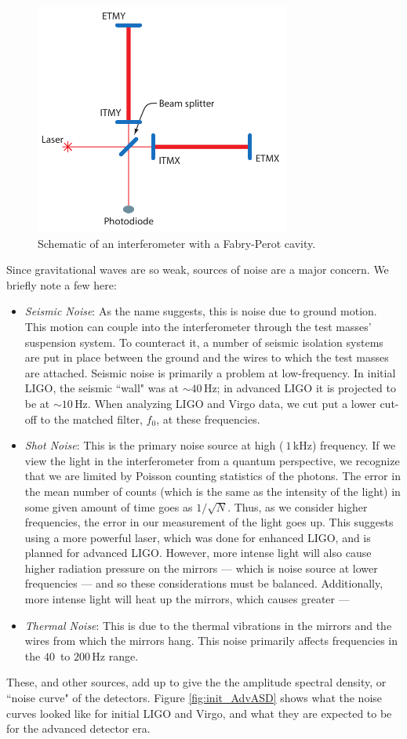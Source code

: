 \begin{figure}[htbp]
\center
\includegraphics[height=3in]{figures/fabry-perot.pdf}
\caption{Schematic of an interferometer with a Fabry-Perot cavity.}
\label{fig:fabry_perot}
\end{figure}

Since gravitational waves are so weak, sources of noise are a major concern. We briefly note a few here:
\begin{itemize}
\item{\emph{Seismic Noise}: As the name suggests, this is noise due to ground motion. This motion can couple into the interferometer through the test masses' suspension system. To counteract it, a number of seismic isolation systems are put in place between the ground and the wires to which the test masses are attached. Seismic noise is primarily a problem at low-frequency. In initial \ac{LIGO}, the seismic ``wall" was at $\sim 40\,$Hz; in advanced \ac{LIGO} it is projected to be at $\sim 10\,$Hz. When analyzing \ac{LIGO} and Virgo data, we cut put a lower cut-off to the matched filter, $f_0$, at these frequencies.}
\item{\emph{Shot Noise}: This is the primary noise source at high ($~1\,$kHz) frequency. If we view the light in the interferometer from a quantum perspective, we recognize that we are limited by Poisson counting statistics of the photons. The error in the mean number of counts (which is the same as the intensity of the light) in some given amount of time goes as $1/\sqrt{N}$. Thus, as we consider higher frequencies, the error in our measurement of the light goes up. This suggests using a more powerful laser, which was done for enhanced \ac{LIGO}, and is planned for advanced \ac{LIGO}. However, more intense light will also cause higher radiation pressure on the mirrors --- which is noise source at lower frequencies --- and so these considerations must be balanced. Additionally, more intense light will heat up the mirrors, which causes greater ---}
\item{\emph{Thermal Noise}: This is due to the thermal vibrations in the mirrors and the wires from which the mirrors hang. This noise primarily affects frequencies in the $40\,$ to $200\,$Hz range.}
\end{itemize}
These, and other sources, add up to give the the amplitude spectral density, or ``noise curve" of the detectors. Figure \ref{fig:init_AdvASD} shows what the noise curves looked like for initial \ac{LIGO} and Virgo, and what they are expected to be for the advanced detector era.

